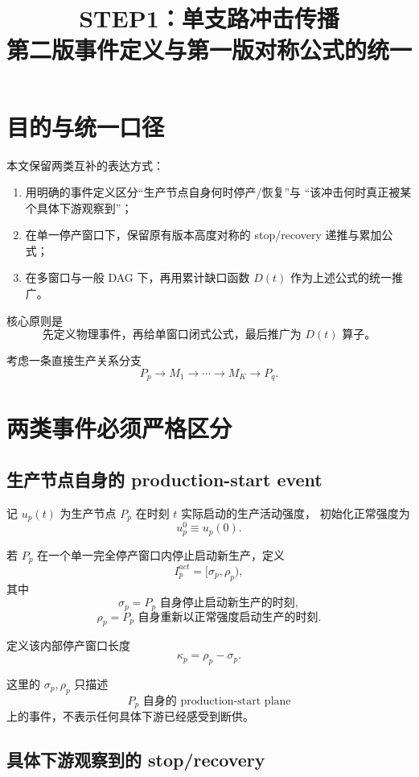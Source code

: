 \documentclass[UTF8,11pt]{ctexart}
\title{STEP1：单支路冲击传播\\
第二版事件定义与第一版对称公式的统一}
\author{}
\date{}
\begin{document}
\maketitle

\section{目的与统一口径}

本文保留两类互补的表达方式：

\begin{enumerate}
    \item 用明确的事件定义区分“生产节点自身何时停产/恢复”与
    “该冲击何时真正被某个具体下游观察到”；
    \item 在单一停产窗口下，保留原有版本高度对称的
    stop/recovery 递推与累加公式；
    \item 在多窗口与一般 DAG 下，再用累计缺口函数 \(D(t)\)
    作为上述公式的统一推广。
\end{enumerate}

核心原则是
\[
\boxed{
\text{先定义物理事件，再给单窗口闭式公式，最后推广为 \(D(t)\) 算子。}
}
\]

考虑一条直接生产关系分支
\[
P_p\longrightarrow M_1\longrightarrow\cdots
\longrightarrow M_K\longrightarrow P_q.
\]

\section{两类事件必须严格区分}

\subsection{生产节点自身的 production-start event}

记 \(u_p(t)\) 为生产节点 \(P_p\) 在时刻 \(t\) 实际启动的生产活动强度，
初始化正常强度为
\[
u_p^0\equiv u_p(0).
\]

若 \(P_p\) 在一个单一完全停产窗口内停止启动新生产，定义
\[
\boxed{
I_p^{act}=[\sigma_p,\rho_p),
}
\]
其中
\[
\boxed{
\sigma_p
=
\text{\(P_p\) 自身停止启动新生产的时刻},
}
\]
\[
\boxed{
\rho_p
=
\text{\(P_p\) 自身重新以正常强度启动生产的时刻}.
}
\]

定义该内部停产窗口长度
\[
\boxed{
\kappa_p=\rho_p-\sigma_p.
}
\]

这里的 \(\sigma_p,\rho_p\) 只描述
\[
\boxed{\text{\(P_p\) 自身的 production-start plane}}
\]
上的事件，不表示任何具体下游已经感受到断供。

\subsection{具体下游观察到的 stop/recovery}
\end{document}
